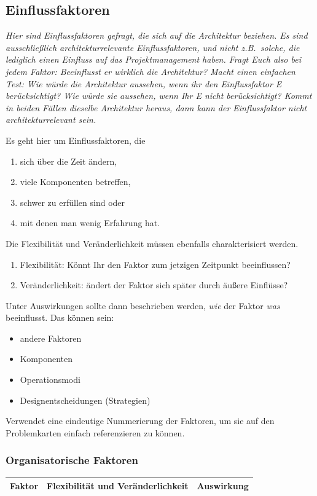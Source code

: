 \documentclass[fontsize=12pt,paper=a4,twoside]{scrartcl}
\begin{document}
\subsection{Einflussfaktoren}
\label{sec:einflussfaktoren}
{\it Hier sind Einflussfaktoren gefragt, die sich auf die Architektur
  beziehen. Es sind ausschließlich architekturrelevante
  Einflussfaktoren, und nicht z.B.\ solche, die lediglich einen
  Einfluss auf das Projektmanagement haben. Fragt Euch also bei jedem
  Faktor: Beeinflusst er wirklich die Architektur? Macht einen
  einfachen Test: Wie würde die Architektur aussehen, wenn ihr den
  Einflussfaktor E berücksichtigt? Wie würde sie aussehen, wenn Ihr E nicht
  berücksichtigt? Kommt in beiden Fällen dieselbe Architektur heraus,
  dann kann der Einflussfaktor nicht architekturrelevant sein.

  Es geht hier um Einflussfaktoren, die
  \begin{enumerate}
  \item sich über die Zeit ändern,
  \item viele Komponenten betreffen,
  \item schwer zu erfüllen sind oder
  \item mit denen man wenig Erfahrung hat.
  \end{enumerate}
  Die Flexibilität und Veränderlichkeit müssen ebenfalls charakterisiert werden. 
  \begin{enumerate}
  \item Flexibilität: Könnt Ihr den Faktor zum jetzigen Zeitpunkt beeinflussen?
  \item Veränderlichkeit: ändert der Faktor sich später durch äußere Einflüsse?
\end{enumerate}

  Unter Auswirkungen sollte dann beschrieben werden, {\em wie} der
  Faktor {\em was} beeinflusst. Das können sein:
  \begin{itemize}
  \item andere Faktoren
  \item Komponenten
  \item Operationsmodi
  \item Designentscheidungen (Strategien)
  \end{itemize}

  Verwendet eine eindeutige Nummerierung der Faktoren, um sie auf den
  Problemkarten einfach referenzieren zu können.  }

\subsubsection{Organisatorische Faktoren}
\begin{tabularx}{\textwidth}{|p{3.5cm}|X|X|}
\hline
\textbf{Faktor} & \textbf{Flexibilität und Veränderlichkeit} & \textbf{Auswirkung}\\\hline
\end{tabularx}\newline
\end{document}
